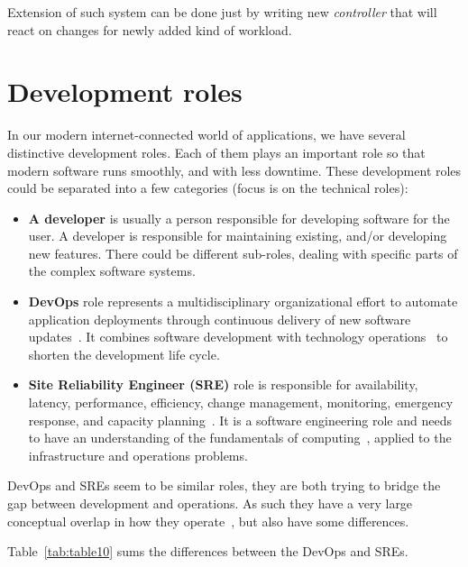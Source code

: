 Extension of such system can be done just by writing new \emph{controller} that will react on changes for newly added kind of workload.
%
%
\section{Development roles}\label{sec:dev_roles}
%
In our modern internet-connected world of applications, we have several distinctive development roles. Each of them plays an important role so that modern software runs smoothly, and with less downtime. These development roles could be separated into a few categories (focus is on the technical roles):

\begin{itemize}
	\item \textbf{A developer} is usually a person responsible for developing software for the user. A developer is responsible for maintaining existing, and/or developing new features. There could be different sub-roles, dealing with specific parts of the complex software systems.
	\item \textbf{DevOps} role represents a multidisciplinary organizational effort to automate application deployments through continuous delivery of new software updates~\cite{LeiteRKMM20}. It combines software development with technology operations~\cite{JabbariAPT16} to shorten the development life cycle.
	\item \textbf{Site Reliability Engineer (SRE)} role is responsible for availability, latency, performance, efficiency, change management, monitoring, emergency response, and capacity planning~\cite{beyer2016site}. It is a software engineering role and needs to have an understanding of the fundamentals of computing~\cite{JonesUN15}, applied to the infrastructure and operations problems.
\end{itemize}

\noindent
DevOps and SREs seem to be similar roles, they are both trying to bridge the gap between development and operations. As such they have a very large conceptual overlap in how they operate~\cite{46939}, but also have some differences. 

Table~\ref{tab:table10} sums the differences between the DevOps and SREs.

